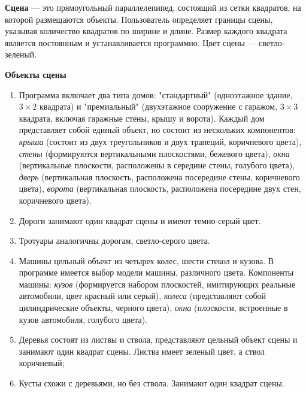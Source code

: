 
\textbf{Сцена } --- это прямоугольный параллелепипед, состоящий из сетки квадратов, на которой размещаются объекты.
Пользователь определяет границы сцены, указывая количество квадратов по ширине и длине.
Размер каждого квадрата является постоянным и устанавливается программно.
Цвет сцены --- светло-зеленый.

\textbf{Объекты сцены}

\begin{enumerate}
	\item Программа включает два типа домов: "стандартный" (одноэтажное здание, $3 \times 2$ квадрата) и "премиальный" (двухэтажное сооружение с гаражом, $3\times 3$ квадрата, включая гаражные стены, крышу и ворота). 
	Каждый дом представляет собой единый объект, но состоит из нескольких компонентов:
	\textit{крыша} (состоит из двух треугольников и двух трапеций, коричневого цвета),
	\textit{стены} (формируются вертикальными плоскостями, бежевого цвета),
	\textit{окна} (вертикальные плоскости, расположены в середине стены, голубого цвета), 
	\textit{дверь} (вертикальная плоскость, расположена посередине стены, коричневого цвета),
	\textit{ворота} (вертикальная плоскость, расположена посередине двух стен, коричневого цвета).
	
	\item Дороги занимают один квадрат сцены и имеют темно-серый цвет.

	\item Тротуары аналогичны дорогам, светло-серого цвета.
	
	\item Машины цельный объект из четырех колес, шести стекол и кузова. 
	В программе имеется выбор модели машины, различного цвета. Компоненты машины:
	\textit{кузов} (формируется набором плоскостей, имитирующих реальные автомобили, цвет красный или серый),
	\textit{колеса} (представляют собой цилиндрические объекты, черного цвета),
	\textit{окна} (плоскости, встроенные в кузов автомобиля, голубого цвета).

	\item Деревья состоят из листвы и ствола, представляют цельный объект сцены и занимают один квадрат сцены. Листва имеет зеленый цвет, а ствол коричневый;

	\item Кусты схожи с деревьями, но без ствола. Занимают один квадрат сцены.
\end{enumerate}

